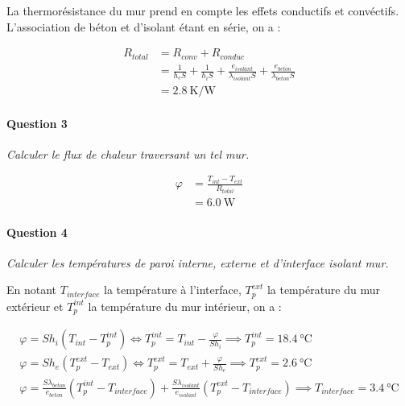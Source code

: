 \documentclass[oneside,a4paper,13pt]{book}
\begin{document}
La thermorésistance du mur prend en compte les effets conductifs et convéctifs. L'association de béton et d'isolant étant en série, on a  :

\begin{equation} \label{eq1}
\begin{split}
	R_{total} & = R_{conv} + R_{conduc} \\
	& = \frac{1}{h_{e} S} +  \frac{1}{h_{i} S} +  \frac{e_{isolant}}{\lambda_{isolant} S} + \frac{e_{beton}}{\lambda_{beton} S} \\
	& = \SI{2.8}{\kelvin\per\watt}
\end{split}
\end{equation}

\paragraph{Question 3} 
\textit{Calculer le flux de chaleur traversant un tel mur.}  

\begin{equation} \label{eq2}
\begin{split}
	\varphi & = \frac{T_{int} - T_{ext}}{R_{total}} \\
	& = \SI{6.0}{\watt}
\end{split}
\end{equation}

\paragraph{Question 4} 
\textit{Calculer les températures de paroi interne, externe et d’interface isolant mur.} 

En notant $T_{interface}$ la température à l'interface, $T_{p}^{ext}$ la température du mur extérieur et  $T_{p}^{int}$ la température du mur intérieur, on a :

\begin{gather}
	\varphi = S h_{i} (T_{int} - T_{p}^{int}) \Leftrightarrow T_{p}^{int} = T_{int} - \frac{\varphi}{S h_{i}}   \implies   T_{p}^{int} = \SI{18.4}{\celsius} \\
	\varphi = S h_{e}  (T_{p}^{ext} - T_{ext}) \Leftrightarrow T_{p}^{ext} = T_{ext} + \frac{\varphi}{S h_{e}} \implies   T_{p}^{ext} = \SI{2.6}{\celsius} \\
	\varphi = \frac{S \lambda_{beton}}{e_{beton}} (T_{p}^{int} - T_{interface}) + \frac{S \lambda_{isolant}}{e_{isolant}} (T_{p}^{ext} - T_{interface}) \implies T_{interface} = \SI{3.4}{\celsius}
\end{gather}
\end{document}
